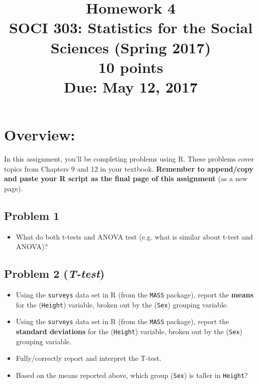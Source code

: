 \documentclass{article}
\begin{document}
\title{Homework 4\\ SOCI 303: Statistics for the Social Sciences (Spring 2017) \\ {\large{10 points}} \\ {\large{Due: May 12, 2017}}}
\author[*]{}
\date{}
\maketitle



\section*{Overview:}
In this assignment, you'll be completing problems using R. These problems cover topics from Chapters 9 and 12 in your textbook. \textbf{Remember to append/copy and paste your R script as the final page of this assignment} (as a new page).

\subsection*{Problem 1}
\begin{itemize}
\item What do both t-tests and ANOVA test (e.g. what is similar about t-test and ANOVA)?
\end{itemize}


\subsection*{Problem 2 (\textit{T-test})}
\begin{itemize}
\item Using the \texttt{surveys} data set in R (from the \texttt{MASS} package), report the \textbf{means} for the (\texttt{Height}) variable, broken out by the (\texttt{Sex}) grouping variable.
\item Using the \texttt{surveys} data set in R (from the \texttt{MASS} package), report the \textbf{standard deviations} for the (\texttt{Height}) variable, broken out by the (\texttt{Sex}) grouping variable.
\item Fully/correctly report and interpret the T-test.
\item Based on the means reported above, which group (\texttt{Sex}) is taller in \texttt{Height}?
\end{itemize}
\end{document}
